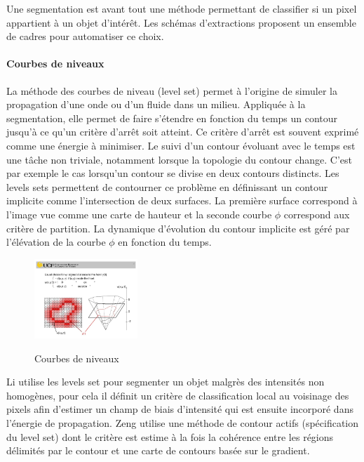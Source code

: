 Une segmentation est avant tout une méthode permettant de classifier si un pixel appartient à un objet d'intérêt. Les schémas d'extractions proposent un ensemble de cadres pour automatiser ce choix.

\paragraph{Courbes de niveaux}
La méthode des courbes de niveau (level set) permet à l'origine de simuler la propagation d'une onde ou d'un fluide dans un milieu. Appliquée à la segmentation, elle permet de faire s'étendre en fonction du temps un contour jusqu'à ce qu'un critère d'arrêt soit atteint. Ce critère d'arrêt est souvent exprimé comme une énergie à minimiser. Le suivi d'un contour évoluant avec le temps est une tâche non triviale, notamment lorsque la topologie du contour change. C'est par exemple le cas lorsqu'un contour se divise en deux contours distincts. Les levels sets permettent de contourner ce problème en définissant un contour implicite comme l'intersection de deux surfaces. La première surface correspond à l'image vue comme une carte de hauteur et la seconde courbe $\phi$ correspond aux critère de partition. La dynamique d'évolution du contour implicite est géré par l'élévation de la courbe $\phi$ en fonction du temps.

\begin{figure}
  \centering
  \includegraphics[height=3cm]{Images/level_set_active_contour.jpeg}
  \label{fig:Courbes de niveaux}
  \caption{Courbes de niveaux}
\end{figure}

Li \cite{Li2011_mri_level_set} utilise les levels set pour segmenter un objet malgrès des intensités non homogènes, pour cela il définit un critère de classification local au voisinage des pixels afin d'estimer un champ de biais d'intensité qui est ensuite incorporé dans l'énergie de propagation. Zeng \cite{Zeng2018_liver_hybrid_active_contour_region_growing} utilise une méthode de contour actifs (spécification du level set) dont le critère est estime à la fois la cohérence entre les régions délimités par le contour et une carte de contours basée sur le gradient.

